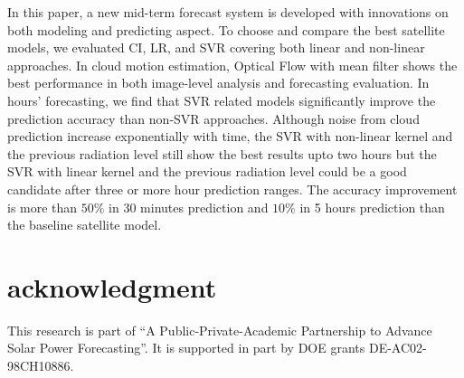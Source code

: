 \documentclass[conference]{IEEEtran}
\begin{document}
In this paper, a new mid-term forecast system is developed with innovations on
both modeling and predicting aspect. To choose and compare the best satellite
models, we evaluated CI, LR, and SVR covering both linear and non-linear
approaches.
In cloud motion estimation, Optical Flow with mean filter shows the best performance
in both image-level analysis and forecasting evaluation. In hours'
forecasting, we find that SVR related models significantly improve the prediction accuracy
than non-SVR approaches. Although noise from cloud prediction increase
exponentially with time, the SVR with non-linear kernel and the previous radiation level 
still show the best results upto two hours
but the SVR with linear kernel and the previous radiation level could be a good candidate after three 
or more hour prediction ranges. The accuracy improvement is more than $50\%$ in 30 minutes 
prediction and $10\%$ in 5 hours prediction than the baseline satellite model.


\section{acknowledgment} 
\label{sec:acknowledgment}
This research is part of “A Public-Private-Academic Partnership
to Advance Solar Power Forecasting”. It is supported
in part by DOE grants DE-AC02-98CH10886.



%
%



% 
\end{document}

